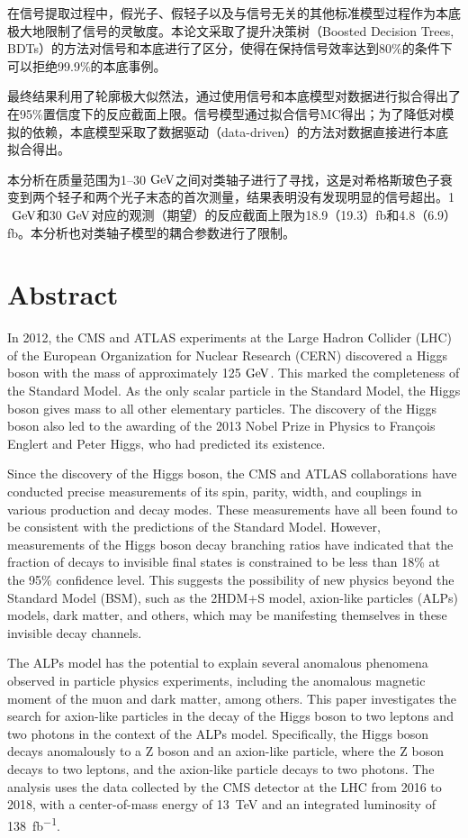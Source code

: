 在信号提取过程中，假光子、假轻子以及与信号无关的其他标准模型过程作为本底极大地限制了信号的灵敏度。本论文采取了提升决策树（Boosted Decision Trees, BDTs）的方法对信号和本底进行了区分，使得在保持信号效率达到80\%的条件下可以拒绝99.9\%的本底事例。

最终结果利用了轮廓极大似然法，通过使用信号和本底模型对数据进行拟合得出了在95\%置信度下的反应截面上限。信号模型通过拟合信号MC得出；为了降低对模拟的依赖，本底模型采取了数据驱动（data-driven）的方法对数据直接进行本底拟合得出。

本分析在质量范围为1--30$\GeV$之间对类轴子进行了寻找，这是对希格斯玻色子衰变到两个轻子和两个光子末态的首次测量，结果表明没有发现明显的信号超出。1$\GeV$和30$\GeV$对应的观测（期望）的反应截面上限为18.9（19.3）\si{fb}和4.8（6.9）\si{fb}。本分析也对类轴子模型的耦合参数进行了限制。

\intobmk\chapter*{Abstract}%

In 2012, the CMS and ATLAS experiments at the Large Hadron Collider (LHC) of the European Organization for Nuclear Research (CERN) discovered a Higgs boson with the mass of approximately 125$\GeV$. This marked the completeness of the Standard Model. As the only scalar particle in the Standard Model, the Higgs boson gives mass to all other elementary particles. The discovery of the Higgs boson also led to the awarding of the 2013 Nobel Prize in Physics to François Englert and Peter Higgs, who had predicted its existence.

Since the discovery of the Higgs boson, the CMS and ATLAS collaborations have conducted precise measurements of its spin, parity, width, and couplings in various production and decay modes. These measurements have all been found to be consistent with the predictions of the Standard Model. However, measurements of the Higgs boson decay branching ratios have indicated that the fraction of decays to invisible final states is constrained to be less than 18\% at the 95\% confidence level. This suggests the possibility of new physics beyond the Standard Model (BSM), such as the 2HDM+S model, axion-like particles (ALPs) models, dark matter, and others, which may be manifesting themselves in these invisible decay channels.
   
The ALPs model has the potential to explain several anomalous phenomena observed in particle physics experiments, including the anomalous magnetic moment of the muon and dark matter, among others.
This paper investigates the search for axion-like particles in the decay of the Higgs boson to two leptons and two photons in the context of the ALPs model. Specifically, the Higgs boson decays anomalously to a Z boson and an axion-like particle, where the Z boson decays to two leptons, and the axion-like particle decays to two photons. The analysis uses the data collected by the CMS detector at the LHC from 2016 to 2018, with a center-of-mass energy of 13~\si{\TeV} and an integrated luminosity of 138~\si{fb^{-1}}.


